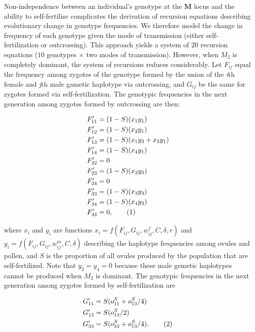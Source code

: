 \documentclass[9pt,twocolumn,twoside,lineno]{gsajnl}
\newcommand\numberthis{\addtocounter{equation}{1}\tag{\theequation}}
\begin{document}
Non-independence between an individual's genotype at the $\mathbf{M}$ locus and the ability to self-fertilize complicates the derivation of recursion equations describing evolutionary change in genotype frequencies. We therefore model the change in frequency of each genotype given the mode of transmission (either self-fertilization or outcrossing). This approach yields a system of $20$ recursion equations ($10$ genotypes $\times$ two modes of transmission). However, when $M_2$ is completely dominant, the system of recursions reduces considerably. Let $F_{ij}$ equal the frequency among zygotes of the genotype formed by the union of the \textit{i}th female and \textit{j}th male gametic haplotype via outcrossing, and $G_{ij}$ be the same for zygotes formed via self-fertilization. The genotypic frequencies in the next generation among zygotes formed by outcrossing are then:
\begin{linenomath}\begin{align*} \label{eq:FprGyn}
    F'_{11} &= (1 - S) (x_1 y_1)  \\
    F'_{12} &= (1 - S) (x_2 y_1)  \\
    F'_{13} &= (1 - S) (x_1 y_3 + x_3 y_1)  \\
    F'_{14} &= (1 - S) (x_4 y_1)  \\
    F'_{22} &= 0 \\
    F'_{23} &= (1 - S) (x_2 y_3)  \\
    F'_{24} &= 0 \\
    F'_{33} &= (1 - S) (x_3 y_3)  \\
    F'_{34} &= (1 - S) (x_4 y_3)  \\
    F'_{44} &= 0, \numberthis
\end{align*}\end{linenomath}

\noindent where $x_{i}$ and $y_{i}$ are functions $x_i=f(F_{ij},G_{ij},w^f_{ij},C,\delta,r)$ and $y_i=f(F_{ij},G_{ij},w^m_{ij},C,\delta)$ describing the haplotype frequencies among ovules and pollen, and $S$ is the proportion of all ovules produced by the population that are self-fertilized. Note that $y_2=y_4=0$ because these male gemetic haplotypes cannot be produced when $M_2$ is dominant. The genotypic frequencies in the next generation among zygotes formed by self-fertilization are 
\begin{linenomath}\begin{align*} \label{eq:GprGyn}
    G'_{11} &= S (o^S_{11} + o^S_{13}/4) \\
    G'_{13} &= S (o^S_{13}/2) \\
    G'_{33} &= S (o^S_{33} + o^S_{13}/4), \numberthis
\end{align*} \end{linenomath}
\end{document}
